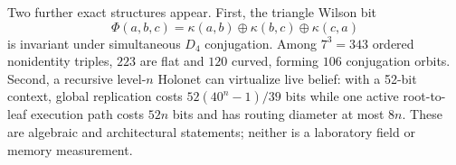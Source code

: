Two further exact structures appear.  First, the triangle Wilson bit
\[
\Phi(a,b,c)=\kappa(a,b)\oplus\kappa(b,c)\oplus\kappa(c,a)
\]
is invariant under simultaneous $D_4$ conjugation.  Among $7^3=343$ ordered nonidentity triples, $223$ are flat and $120$ curved, forming $106$ conjugation orbits.  Second, a recursive level-$n$ Holonet can virtualize live belief: with a 52-bit context, global replication costs $52(40^n-1)/39$ bits while one active root-to-leaf execution path costs $52n$ bits and has routing diameter at most $8n$.  These are algebraic and architectural statements; neither is a laboratory field or memory measurement.

